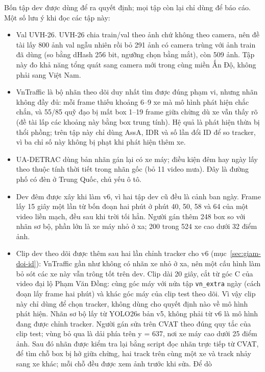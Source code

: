 Bốn tập dev được dùng để ra quyết định; mọi tập còn lại chỉ dùng để báo cáo. Một số lưu ý khi đọc các tập này:
\begin{itemize}
  \item Val UVH-26. UVH-26 chia train/val theo ảnh chứ không theo camera, nên đề tài lấy 800 ảnh val ngẫu
        nhiên rồi bỏ 291 ảnh có camera trùng với ảnh train đã dùng (so bằng dHash 256 bit, ngưỡng chọn bằng mắt), còn
        509 ảnh. Tập này đo khả năng tổng quát sang camera mới trong cùng miền Ấn Độ, không phải sang Việt Nam.
  \item VnTraffic là bộ nhãn theo dõi duy nhất tìm được đúng phạm vi, nhưng nhãn không đầy đủ: mỗi frame thiếu
        khoảng 6--9 xe mà mô hình phát hiện chắc chắn, và 55/85 quỹ đạo bị mất box 1--19 frame giữa chừng dù xe vẫn
        thấy rõ (đề tài lấp các khoảng này bằng box trung tính). Hệ quả là phát hiện thừa bị thổi phồng; trên tập này chỉ
        dùng AssA, IDR và số lần đổi ID để so tracker, vì ba chỉ số này không bị phạt khi phát hiện thêm xe.
  \item UA-DETRAC dùng bản nhãn gán lại có xe máy; điều kiện đêm hay ngày lấy theo thuộc tính thời tiết trong
        nhãn gốc (bỏ 11 video mưa). Đây là đường phố có đèn ở Trung Quốc, chủ yếu ô tô.
  \item Dev đêm được xây khi làm v6, vì hai tập dev cũ đều là cảnh ban ngày. Frame lấy 15 giây một lần từ bốn
        đoạn hai phút ở phút 40, 50, 58 và 64 của một video liền mạch, đều sau khi trời tối hẳn. Người gán thêm 248 box so với nhãn sơ bộ, phần lớn là
        xe máy nhỏ ở xa; 200 trong 524 xe cao dưới 32 điểm ảnh.
  \item Clip dev theo dõi được thêm sau hai lần chỉnh tracker cho v6 (mục~\ref{sec:giam-doi-id}): VnTraffic gần
        như không có nhãn xe nhỏ ở xa, nên một cấu hình làm bỏ sót các xe này vẫn trông tốt trên dev. Clip dài 20 giây,
        cắt từ góc C của video đại lộ Phạm Văn Đồng: cùng góc máy với nửa tập \texttt{vn\_extra} ngày (cách đoạn lấy
        frame hai phút) và khác góc máy của clip test theo dõi. Vì vậy clip này chỉ dùng để chọn tracker, không dùng cho
        quyết định nào về mô hình phát hiện. Nhãn sơ bộ lấy từ YOLO26s bản v5, không phải từ v6 là mô hình đang được chỉnh
        tracker. Người gán sửa trên CVAT theo đúng quy tắc của clip test; vùng bỏ qua là dải phía trên y = 637, nơi xe máy
        cao dưới 25 điểm ảnh. Sau đó nhãn được kiểm tra lại bằng script đọc nhãn trực tiếp từ CVAT, để tìm chỗ box bị hở
        giữa chừng, hai track trên cùng một xe và track nhảy sang xe khác; mỗi chỗ đều được xem ảnh trước khi sửa. Để dò

\end{itemize}
